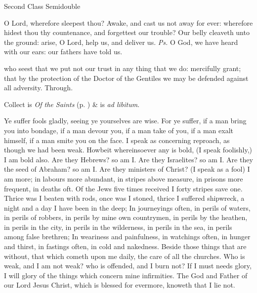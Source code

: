 \begin{inhead}
{Second Class Semidouble}
\end{inhead}

\properantiphonfix

\introit
{} O Lord, wherefore sleepest thou? Awake, and cast us not away for ever: wherefore hidest thou thy countenance, and forgettest our trouble? Our belly cleaveth unto the ground: arise, O Lord, help us, and deliver us. \textit{Ps.} O God, we have heard with our ears: our fathers have told us.

\collect
{} who seest that we put not our trust in any thing that we do: mercifully grant; that by the protection of the Doctor of the Gentiles we may be defended against all adversity. Through.
\begin{rubric}
     Collect is \emph{Of the Saints} (p. \pageref{SPSaints}) \&  is \emph{ad libitum}.
\end{rubric}

 Ye suffer fools gladly, seeing ye yourselves are wise. For ye suffer, if a man bring you into bondage, if a man devour you, if a man take of you, if a man exalt himself, if a man smite you on the face. I speak as concerning reproach, as though we had been weak. Howbeit whereinsoever any is bold, (I speak foolishly,) I am bold also. Are they Hebrews? so am I. Are they Israelites? so am I. Are they the seed of Abraham? so am I. Are they ministers of Christ? (I speak as a fool) I am more; in labours more abundant, in stripes above measure, in prisons more frequent, in deaths oft. Of the Jews five times received I forty stripes save one. Thrice was I beaten with rods, once was I stoned, thrice I suffered shipwreck, a night and a day I have been in the deep; In journeyings often, in perils of waters, in perils of robbers, in perils by mine own countrymen, in perils by the heathen, in perils in the city, in perils in the wilderness, in perils in the sea, in perils among false brethren; In weariness and painfulness, in watchings often, in hunger and thirst, in fastings often, in cold and nakedness. Beside those things that are without, that which cometh upon me daily, the care of all the churches. Who is weak, and I am not weak? who is offended, and I burn not? If I must needs glory, I will glory of the things which concern mine infirmities. The God and Father of our Lord Jesus Christ, which is blessed for evermore, knoweth that I lie not.

